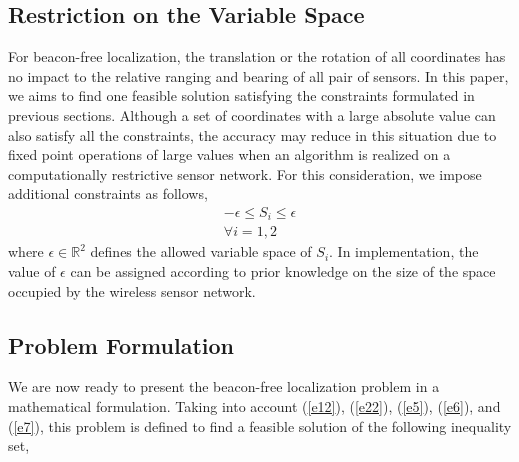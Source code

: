\documentclass[journal]{IEEEtran}
\begin{document}
\subsection{Restriction on the Variable Space}
For beacon-free localization, the translation or the rotation of all coordinates has no impact to the relative ranging and bearing of all pair of sensors. In this paper, we aims to find one feasible solution satisfying the constraints formulated in previous sections. Although a set of coordinates with a large absolute value can also satisfy all the constraints, the accuracy may reduce in this situation due to fixed point operations of large values when an algorithm is realized on a computationally restrictive sensor network. For this consideration, we impose additional constraints as follows,
\begin{eqnarray}\label{e7}
-\epsilon\leq S_i\leq \epsilon\nonumber\\
\forall i=1,2
\end{eqnarray}
where $\epsilon\in\mathbb{R}^2$ defines the allowed variable space of $S_i$. In implementation, the value of $\epsilon$ can be assigned according to prior knowledge on the size of the space occupied by the wireless sensor network.

\subsection{Problem Formulation}

We are now ready to present the beacon-free localization problem in a mathematical formulation. Taking into account (\ref{e12}), (\ref{e22}), (\ref{e5}), (\ref{e6}), and (\ref{e7}), this problem  is defined to find a feasible solution of the following inequality set,
\end{document}
